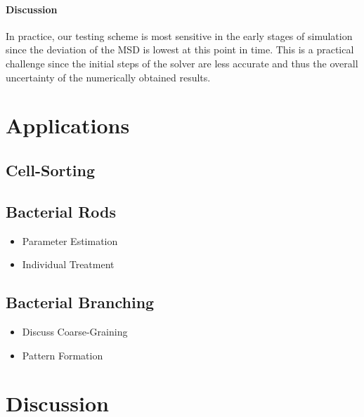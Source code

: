 \documentclass[a4paper]{article}
\begin{document}
\paragraph{Discussion}
In practice, our testing scheme is most sensitive in the early stages of simulation since the
deviation of the MSD is lowest at this point in time.
This is a practical challenge since the initial steps of the solver are less accurate and thus the
overall uncertainty of the numerically obtained results.

\pagebreak
\section{Applications}
\subsection{Cell-Sorting}
\subsection{Bacterial Rods}
\begin{itemize}
    \item Parameter Estimation
    \item Individual Treatment
\end{itemize}
\subsection{Bacterial Branching}
\begin{itemize}
    \item Discuss Coarse-Graining
    \item Pattern Formation
\end{itemize}

\section{Discussion}

\end{document}

